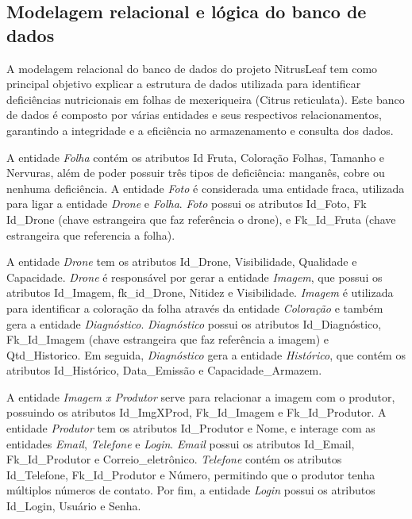 \documentclass[
  a4paper,%
  12pt,%
  english,%
  brazilian,%
]{article}
\begin{document}
\subsection*{\textbf{Modelagem relacional e lógica do banco de dados}}


A modelagem relacional do banco de dados  do projeto NitrusLeaf tem como principal objetivo explicar a estrutura de dados utilizada para identificar deficiências nutricionais em folhas de mexeriqueira (Citrus reticulata). Este banco de dados é composto por várias entidades e seus respectivos relacionamentos, garantindo a integridade e a eficiência no armazenamento e consulta dos dados.

A entidade \textit{Folha} contém os atributos Id Fruta, Coloração Folhas, Tamanho e Nervuras, além de poder possuir três tipos de deficiência: manganês, cobre ou nenhuma deficiência. A entidade \textit{Foto} é considerada uma entidade fraca, utilizada para ligar a entidade \textit{Drone} e \textit{Folha}. \textit{Foto} possui os atributos Id\_Foto, Fk Id\_Drone (chave estrangeira que faz referência o drone), e Fk\_Id\_Fruta (chave estrangeira que referencia a folha).

A entidade \textit{Drone} tem os atributos Id\_Drone, Visibilidade, Qualidade e Capacidade. \textit{Drone} é responsável por gerar a entidade \textit{Imagem}, que possui os atributos Id\_Imagem, fk\_id\_Drone, Nitidez e Visibilidade. \textit{Imagem} é utilizada para identificar a coloração da folha através da entidade \textit{Coloração} e também gera a entidade \textit{Diagnóstico}. \textit{Diagnóstico} possui os atributos Id\_Diagnóstico, Fk\_Id\_Imagem (chave estrangeira que faz referência a imagem) e Qtd\_Historico. Em seguida, \textit{Diagnóstico} gera a entidade \textit{Histórico}, que contém os atributos Id\_Histórico, Data\_Emissão e Capacidade\_Armazem.

A entidade \textit{Imagem x Produtor} serve para relacionar a imagem com o produtor, possuindo os atributos Id\_ImgXProd, Fk\_Id\_Imagem e Fk\_Id\_Produtor. A entidade \textit{Produtor} tem os atributos Id\_Produtor e Nome, e interage com as entidades \textit{Email}, \textit{Telefone} e \textit{Login}. \textit{Email} possui os atributos Id\_Email, Fk\_Id\_Produtor e Correio\_eletrônico. \textit{Telefone} contém os atributos Id\_Telefone, Fk\_Id\_Produtor e Número, permitindo que o produtor tenha múltiplos números de contato. Por fim, a entidade \textit{Login} possui os atributos Id\_Login, Usuário e Senha.
\end{document}

